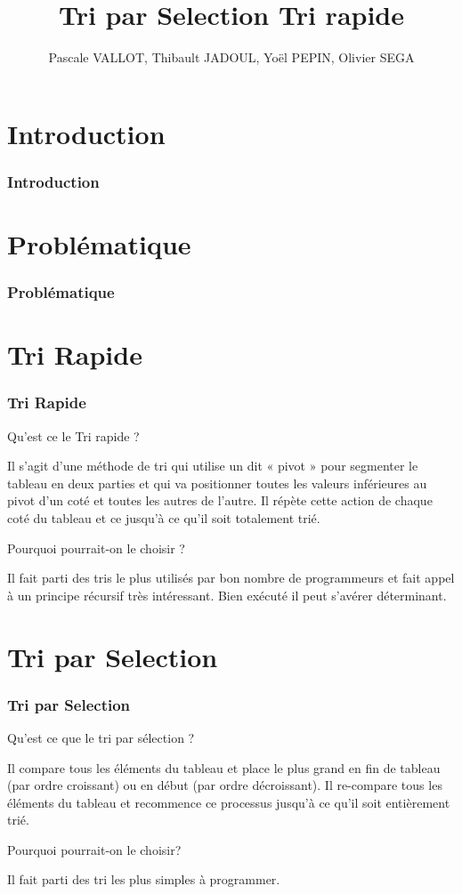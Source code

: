 \documentclass[12pt,french]{beamer}
\title{Tri par Selection Tri rapide}
\author{Pascale VALLOT, Thibault JADOUL, Yoël PEPIN, Olivier SEGA}
\begin{document}
\section{Introduction}
\begin{frame}
\frametitle{Introduction}
\end{frame}
\section{Problématique}
\begin{frame}
\frametitle{Problématique}
\end{frame}
\section{Tri Rapide}
\begin{frame}
\frametitle{Tri Rapide}
Qu’est ce le Tri rapide ?\\
\begin{center}
Il s’agit d’une méthode de tri qui utilise un dit « pivot » pour segmenter le tableau en deux parties et qui va positionner toutes les valeurs inférieures au pivot d’un coté et toutes les autres de l’autre. Il répète cette action de chaque coté du tableau et ce jusqu’à ce qu’il soit totalement trié.
\end{center}
Pourquoi pourrait-on le choisir ?\\
\begin{center}
Il fait parti des tris le plus utilisés par bon nombre de programmeurs et fait appel à un principe récursif très intéressant. Bien exécuté il peut s’avérer déterminant.
\end{center}
\end{frame}
\section{Tri par Selection}
\begin{frame}
\frametitle{Tri par Selection}
Qu’est ce que le tri par sélection ?\\
\begin{center}
Il compare tous les éléments du tableau et place le plus grand en fin de tableau (par ordre croissant) ou en début (par ordre décroissant). Il re-compare tous les éléments du tableau et recommence ce processus jusqu’à ce qu’il soit entièrement trié.
\end{center}
Pourquoi pourrait-on le choisir? 
\begin{center}
Il fait parti des tri les plus simples à programmer. 
\end{center}
\end{frame}
\end{document}
